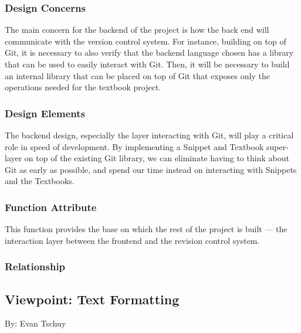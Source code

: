 \documentclass[letterpaper, 10pt, draftclsnofoot, compsoc, onecolumn]{IEEEtran}
\begin{document}
\subsubsection{Design Concerns}
The main concern for the backend of the project is how the back end will communicate
with the version control system. For instance, building on top of Git, it is
necessary to also verify that the backend language chosen has a library that can
be used to easily interact with Git. Then, it will be necessary to build an internal
library that can be placed on top of Git that exposes only the operations needed
for the textbook project.
{\noindent  \par}

\subsubsection{Design Elements}
{\noindent
The backend design, especially the layer interacting with Git, will play a critical
role in speed of development. By implementing a Snippet and Textbook super-layer
on top of the existing Git library, we can eliminate having to think about Git
as early as possible, and spend our time instead on interacting with Snippets and
the Textbooks.
\par}

\subsubsection{Function Attribute}
{\noindent This function provides the base on which the rest of the project is
built — the interaction layer between the frontend and the revision control system. \par}

\subsubsection{Relationship}






\subsection{Viewpoint: Text Formatting}
{\noindent By: Evan Tschuy \par}
\end{document}
